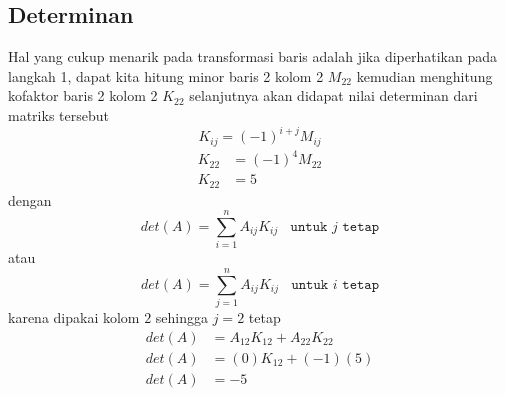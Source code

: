 		\subsection[]{Determinan}Hal yang cukup menarik pada transformasi baris adalah jika diperhatikan pada langkah 1, dapat kita hitung minor baris 2 kolom 2 $M_{22}$ kemudian menghitung kofaktor baris 2 kolom 2 $K_{22}$ selanjutnya akan didapat nilai determinan dari matriks tersebut
		$$K_{ij} = (-1)^{i+j}M_{ij}$$
		\begin{align*}
			K_{22} &= (-1)^{4}M_{22}\\
			K_{22} &= 5
		\end{align*}
		dengan
		$$det(A)=\sum_{i=1}^{n} A_{ij}K_{ij}~~~~ \texttt{untuk $j$ tetap}$$
		atau 
		$$det(A)=\sum_{j=1}^{n} A_{ij}K_{ij}~~~~ \texttt{untuk $i$ tetap}$$
		karena dipakai kolom $2$ sehingga $j=2$ tetap
		\begin{align*}
			det(A)&=A_{12}K_{12} + A_{22}K_{22}\\
			det(A)&=(0)K_{12} + (-1)(5)\\
			det(A)&=-5
		\end{align*}
			
